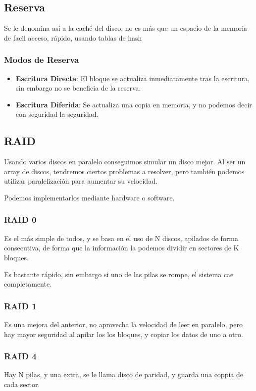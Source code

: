 \subsection{Reserva}
\noindent Se le denomina así a la caché del disco, no es más que un espacio de la memoria de facil acceso, rápido, usando tablas de hash
\subsubsection{Modos de Reserva}
\begin{itemize}
        \item \textbf{Escritura Directa}: El bloque se actualiza inmediatamente tras la escritura, sin embargo no se beneficia de la reserva.
        \item \textbf{Escritura Diferida}: Se actualiza una copia en memoria, y no podemos decir con seguridad la seguridad.
\end{itemize}
\subsection{RAID}
\noindent Usando varios discos en paralelo conseguimos simular un disco mejor. Al ser un array de discos, tendremos ciertos problemas a resolver, pero también podemos utilizar paralelización para aumentar su velocidad.
\par \noindent Podemos implementarlos mediante hardware o software.
\subsubsection{RAID 0}
\noindent Es el más simple de todos, y se basa en el uso de N discos, apilados de forma consecutiva, de forma que la información la podemos dividir en sectores de K bloques.
\par \noindent Es bastante rápido, sin embargo si uno de las pilas se rompe, el sistema cae completamente.
\subsubsection{RAID 1}
\noindent Es una mejora del anterior, no aprovecha la velocidad de leer en paralelo, pero hay mayor seguridad al apilar los los bloques, y copiar los datos de uno a otro.
\subsubsection{RAID 4}
\noindent Hay N pilas, y una extra, se le llama disco de paridad, y guarda una coppia de cada sector.
